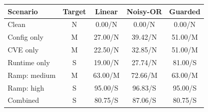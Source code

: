 \begin{tabular}{@{}lcccc@{}}
\toprule
\textbf{Scenario} & \textbf{Target} & \textbf{Linear} & \textbf{Noisy-OR} & \textbf{Guarded} \\
\midrule
Clean & N & 0.00/N & 0.00/N & 0.00/N \\
Config only & M & 27.00/N & 39.42/N & 51.00/M \\
CVE only & M & 22.50/N & 32.85/N & 51.00/M \\
Runtime only & S & 19.00/N & 27.74/N & 81.00/S \\
Ramp: medium & M & 63.00/M & 72.66/M & 63.00/M \\
Ramp: high & S & 95.00/S & 96.83/S & 95.00/S \\
Combined & S & 80.75/S & 87.06/S & 80.75/S \\
\bottomrule
\end{tabular}

